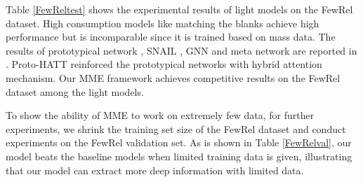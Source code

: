 Table \ref{FewReltest} shows the experimental results of light models on the FewRel dataset. High consumption models like matching the blanks \citep{baldini-soares-etal-2019-matching} achieve high performance but is incomparable since it is trained based on mass data.  The results of prototypical network \citep{proto}, SNAIL \citep{snail}, GNN \citep{gnn} and meta network \citep{metanet} are reported in \citep{han-etal-2018-fewrel}. Proto-HATT \citep{hatt} reinforced the prototypical networks with hybrid attention mechanism. Our MME framework achieves competitive results on the FewRel dataset among the light models.

To show the ability of MME to work on extremely few data, for further experiments, we shrink the training set size of the FewRel dataset and conduct experiments on the FewRel validation set. As is shown in Table \ref{FewRelval}, our model beats the baseline models when limited training data is given, illustrating that our model can extract more deep information with limited data.

%


